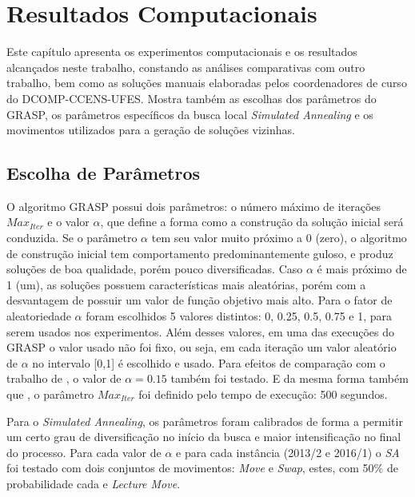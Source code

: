 \chapter{Resultados Computacionais}
\label{sec-resultados}

Este capítulo apresenta os experimentos computacionais e os resultados alcançados neste trabalho, constando as análises comparativas com outro trabalho, bem como as soluções manuais elaboradas pelos coordenadores de curso do DCOMP-CCENS-UFES. Mostra também as escolhas dos parâmetros do GRASP, os parâmetros específicos da busca local \textit{Simulated Annealing} e os movimentos utilizados para a geração de soluções vizinhas.

\section{Escolha de Parâmetros}
\label{sec-res-param}

O algoritmo GRASP possui dois parâmetros: o número máximo de iterações \(Max_{Iter}\) e o valor \(\alpha\), que define a forma como a construção da solução inicial será conduzida. Se o parâmetro \(\alpha\) tem seu valor muito próximo a 0 (zero), o algoritmo de construção inicial tem comportamento predominantemente guloso, e produz soluções de boa qualidade, porém pouco diversificadas. Caso \(\alpha\) é mais próximo de 1 (um), as soluções possuem características mais aleatórias, porém com a desvantagem de possuir um valor de função objetivo mais alto. Para o fator de aleatoriedade \(\alpha\) foram escolhidos 5 valores distintos: 0, 0.25, 0.5, 0.75 e 1, para serem usados nos experimentos. Além desses valores, em uma das execuções do GRASP o valor usado não foi fixo, ou seja, em cada iteração um valor aleatório de \(\alpha\) no intervalo [0,1] é escolhido e usado. Para efeitos de comparação com o trabalho de , o valor de  \(\alpha = 0.15\) também foi testado. E da mesma forma também que , o parâmetro \(Max_{Iter}\) foi definido pelo tempo de execução: 500 segundos. 

Para o \textit{Simulated Annealing}, os parâmetros foram calibrados de forma a permitir um certo grau de diversificação no início da busca e maior intensificação no final do processo. Para cada valor de \(\alpha\) e para cada instância (2013/2 e 2016/1) o \textit{SA} foi testado com dois conjuntos de movimentos: \textit{Move} e \textit{Swap}, estes, com 50\% de probabilidade cada e \textit{Lecture Move}.

